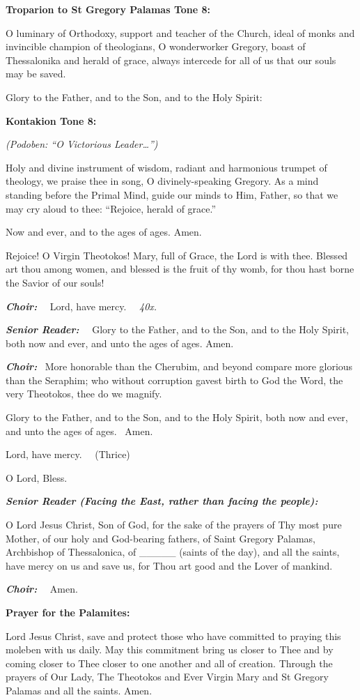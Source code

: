 \textbf{Troparion to St Gregory Palamas Tone 8:}

O luminary of Orthodoxy, support and teacher of the Church, ideal of monks and invincible champion of theologians, O wonderworker Gregory, boast of Thessalonika and herald of grace, always intercede for all of us that our souls may be saved.

Glory to the Father, and to the Son, and to the Holy Spirit:

\textbf{Kontakion Tone 8:}

\emph{(Podoben: ``O Victorious Leader\ldots{}'')}

Holy and divine instrument of wisdom, radiant and harmonious trumpet of theology, we praise thee in song, O divinely-speaking Gregory. 
As a mind standing before the Primal Mind, guide our minds to Him, Father, so that
we may cry aloud to thee: 
``Rejoice, herald of grace.''

Now and ever, and to the ages of ages. Amen.

Rejoice! O Virgin Theotokos! 
Mary, full of Grace, the Lord is with thee.
Blessed art thou among women, and blessed is the fruit of thy womb, for thou hast borne the Savior of our souls!

\textbf{\emph{Choir:}}
~~Lord, have mercy.
~~\emph{40x.}

\textbf{\emph{Senior Reader:}}
~~Glory to the Father, and to the Son, and to the Holy Spirit, both now and ever, and unto the ages of ages. 
Amen.

\textbf{\emph{Choir:}}
~More honorable than the Cherubim, and beyond compare more glorious than the Seraphim; 
who without corruption gavest birth to God the Word, the very Theotokos, thee do we magnify.

Glory to the Father, and to the Son, and to the Holy Spirit, both now and ever, and unto the ages of ages.
~Amen.

Lord, have mercy.
~~(Thrice)

O Lord, Bless.

\textbf{\emph{Senior Reader (Facing the East, rather than facing the
people):}}

O Lord Jesus Christ, Son of God, for the sake of the prayers of Thy most pure Mother, of our holy and God-bearing fathers, of Saint Gregory Palamas, Archbishop of Thessalonica, of \_\_\_\_\_ (saints of the day), and all the saints, have mercy on us and save us, for Thou art good and the Lover of mankind.

\textbf{\emph{Choir:}}
~~Amen.

\textbf{Prayer for the Palamites:}

Lord Jesus Christ, save and protect those who have committed to praying this moleben with us daily. 
May this commitment bring us closer to Thee and by coming closer to Thee closer to one another and all of creation.
Through the prayers of Our Lady, The Theotokos and Ever Virgin Mary and St Gregory Palamas and all the saints. Amen.

